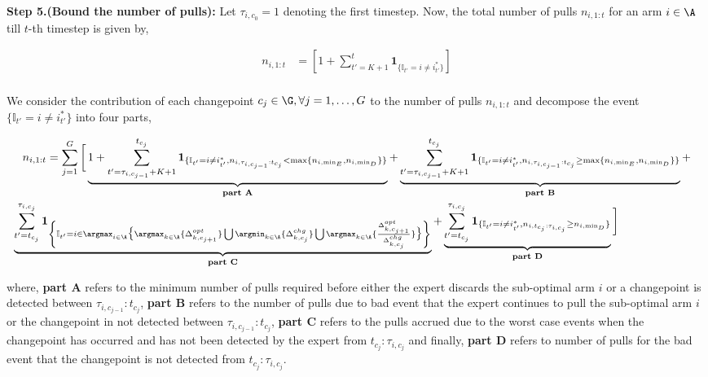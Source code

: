 \begin{customproof}{2}

\textbf{Step 5.(Bound the number of pulls):} Let $\tau_{i,c_{0}}=1$ denoting the first timestep. Now, the total number of pulls  $n_{i,1:t}$ for an arm $i\in\A$ till $t$-th timestep is given by,

\begin{align*}
n_{i,1:t} &= \left[ 1 + \sum_{t'=K+1}^{t}\mathbf{1}_{\lbrace\mathbb{I}_{t'}=i\neq i^*_{t'}\rbrace} \right] \\
\end{align*}

We consider the contribution of each changepoint $c_{j}\in\G,\forall j=1,\ldots,G$ to the number of pulls $n_{i,1:t}$ and decompose the event $\lbrace\mathbb{I}_{t'}=i\neq i^*_{t'}\rbrace$ into four parts,

\begin{align*}
n_{i,1:t} &= \sum_{j=1}^{G}\bigg[ \underbrace{1 + \sum_{t'=\tau_{i,c_{j-1}}+K+1}^{t_{c_j}}\mathbf{1}_{\lbrace\mathbb{I}_{t'}=i\neq i^*_{t'},n_{i,\tau_{i,c_{j-1}}:t_{c_j}} < \max\lbrace n_{i,\min_E}, n_{i,\min_D}\rbrace\rbrace}}_{\textbf{part A}} + \underbrace{\sum_{t'=\tau_{i,c_{j-1}}+K+1}^{t_{c_j}}\mathbf{1}_{\lbrace\mathbb{I}_{t'}=i\neq i^*_{t'},n_{i,\tau_{i,c_{j-1}}:t_{c_j}} \geq \max\lbrace n_{i,\min_E}, n_{i,\min_D}\rbrace\rbrace}}_{\textbf{part B}}+\\
&\hspace*{-3em} \underbrace{\sum_{t'=t_{c_j}}^{\tau_{i,c_j}}\mathbf{1}_{\left\lbrace\mathbb{I}_{t'}=i\in\argmax_{i\in\A}\big\lbrace\argmax_{k\in\A}\lbrace \Delta^{opt}_{k,c_{j+1}}\rbrace \bigcup \argmin_{k\in\A}\lbrace \Delta^{chg}_{k,c_j}\rbrace \bigcup \argmax_{k\in\A}\lbrace \frac{\Delta^{opt}_{k,c_{j+1}}}{\Delta^{chg}_{k,c_j}} \rbrace\big\rbrace \right\rbrace}}_{\textbf{part C}} + \underbrace{\sum_{t'=t_{c_j}}^{\tau_{i,c_j}}\mathbf{1}_{\lbrace\mathbb{I}_{t'}=i\neq i^*_{t'},n_{i,t_{c_j}:\tau_{i,c_{j}}}\geq n_{i,\min_D}\rbrace}}_{\textbf{part D}} \bigg]
\end{align*}

where, \textbf{part A} refers to the minimum number of pulls required before either the expert discards the sub-optimal arm $i$ or a changepoint is detected between $\tau_{i,c_{j-1}}:t_{c_j}$, \textbf{part B} refers to the number of pulls due to bad event that the expert continues to pull the sub-optimal arm $i$ or the changepoint in not detected between $\tau_{i,c_{j-1}}:t_{c_j}$, \textbf{part C} refers to the pulls accrued due to the worst case events when the changepoint has occurred and has not been detected by the expert from $t_{c_j}:\tau_{i,c_{j}}$ and finally, \textbf{part D} refers to number of pulls for the bad event that the changepoint is not detected from $t_{c_j}:\tau_{i,c_{j}}$. 


\end{customproof}
